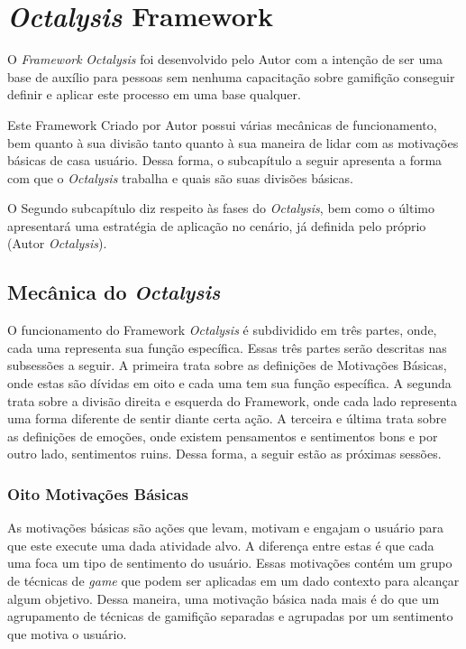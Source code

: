 \section{\textit{Octalysis} Framework}
\label{sub:octalysisframework}
O \textit{Framework} \textit{Octalysis} foi desenvolvido pelo Autor com a intenção de ser uma
base de auxílio para pessoas sem nenhuma capacitação sobre gamifição
conseguir definir e aplicar este processo em uma base qualquer.

Este Framework Criado por Autor possui várias mecânicas de funcionamento,
bem quanto à sua divisão tanto quanto à sua maneira de lidar com as
motivações básicas de casa usuário. Dessa forma, o subcapítulo a seguir
apresenta a forma com que o \textit{Octalysis} trabalha e quais são suas divisões básicas.

O Segundo subcapítulo diz respeito às fases do \textit{Octalysis}, bem como o último
apresentará uma estratégia de aplicação no cenário, já definida pelo próprio
(Autor \textit{Octalysis}).


\subsection{Mecânica do \textit{Octalysis}}
\label{sub:mecanicaoctalysis}
O funcionamento do Framework \textit{Octalysis} é subdividido em três partes, onde,
cada uma representa sua função específica. Essas três partes serão descritas
nas subsessões a seguir. A primeira trata sobre as definições de Motivações
Básicas, onde estas são dívidas em oito e cada uma tem sua função específica.
A segunda trata sobre a divisão direita e esquerda do Framework, onde cada
lado representa uma forma diferente de sentir diante certa ação.
A terceira e última trata sobre as definições de emoções, onde existem
pensamentos e sentimentos bons e por outro lado, sentimentos ruins.
Dessa forma, a seguir estão as próximas sessões.

\subsubsection{Oito Motivações Básicas}
\label{sub:oitomotivacoesbasicas}
As motivações básicas são ações que levam, motivam e engajam
o usuário para que este execute uma dada atividade alvo.
A diferença entre estas é que cada uma foca um tipo de sentimento
do usuário. Essas motivações contém um grupo de técnicas de \textit{game}
que podem ser aplicadas em um dado contexto para alcançar algum
objetivo. Dessa maneira, uma motivação básica nada mais é do
que um agrupamento de técnicas de gamifição separadas e agrupadas
por um sentimento que motiva o usuário.

